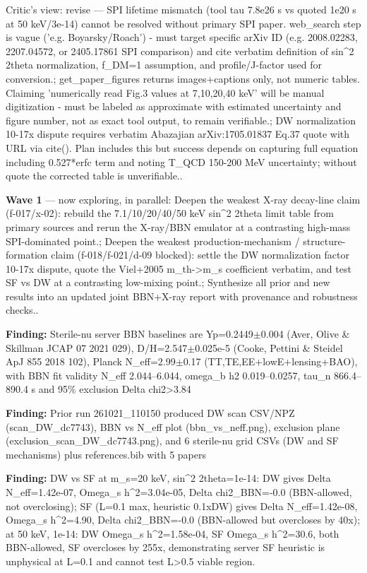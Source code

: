 \documentclass[11pt,a4paper]{article}
\begin{document}
\begin{enumerate}
Critic's view: revise --- SPI lifetime mismatch (tool tau 7.8e26 s vs quoted 1e20 s at 50 keV/3e-14) cannot be resolved without primary SPI paper. web\_search step is vague ('e.g. Boyarsky/Roach') - must target specific arXiv ID (e.g. 2008.02283, 2207.04572, or 2405.17861 SPI comparison) and cite verbatim definition of sin\textasciicircum{}2 2theta normalization, f\_DM=1 assumption, and profile/J-factor used for conversion.; get\_paper\_figures returns images+captions only, not numeric tables. Claiming 'numerically read Fig.3 values at 7,10,20,40 keV' will be manual digitization - must be labeled as approximate with estimated uncertainty and figure number, not as exact tool output, to remain verifiable.; DW normalization 10-17x dispute requires verbatim Abazajian arXiv:1705.01837 Eq.37 quote with URL via cite(). Plan includes this but success depends on capturing full equation including 0.527*erfc term and noting T\_QCD 150-200 MeV uncertainty; without quote the corrected table is unverifiable..

\end{enumerate}
\textbf{Wave 1} --- now exploring, in parallel: Deepen the weakest X-ray decay-line claim (f-017/x-02): rebuild the 7.1/10/20/40/50 keV sin\textasciicircum{}2 2theta limit table from primary sources and rerun the X-ray/BBN emulator at a contrasting high-mass SPI-dominated point.; Deepen the weakest production-mechanism / structure-formation claim (f-018/f-021/d-09 blocked): settle the DW normalization factor 10-17x dispute, quote the Viel+2005 m\_th-\textgreater{}m\_s coefficient verbatim, and test SF vs DW at a contrasting low-mixing point.; Synthesize all prior and new results into an updated joint BBN+X-ray report with provenance and robustness checks..

\textbf{Finding:} Sterile-nu server BBN baselines are Yp=0.2449$\pm$0.004 (Aver, Olive \& Skillman JCAP 07 2021 029), D/H=2.547$\pm$0.025e-5 (Cooke, Pettini \& Steidel ApJ 855 2018 102), Planck N\_eff=2.99$\pm$0.17 (TT,TE,EE+lowE+lensing+BAO), with BBN fit validity N\_eff 2.044--6.044, omega\_b h2 0.019--0.0257, tau\_n 866.4--890.4 s and 95\% exclusion Delta chi2\textgreater{}3.84

\textbf{Finding:} Prior run 261021\_110150 produced DW scan CSV/NPZ (scan\_DW\_dc7743), BBN vs N\_eff plot (bbn\_vs\_neff.png), exclusion plane (exclusion\_scan\_DW\_dc7743.png), and 6 sterile-nu grid CSVs (DW and SF mechanisms) plus references.bib with 5 papers

\textbf{Finding:} DW vs SF at m\_s=20 keV, sin\textasciicircum{}2 2theta=1e-14: DW gives Delta N\_eff=1.42e-07, Omega\_s h\textasciicircum{}2=3.04e-05, Delta chi2\_BBN=-0.0 (BBN-allowed, not overclosing); SF (L=0.1 max, heuristic 0.1xDW) gives Delta N\_eff=1.42e-08, Omega\_s h\textasciicircum{}2=4.90, Delta chi2\_BBN=-0.0 (BBN-allowed but overcloses by 40x); at 50 keV, 1e-14: DW Omega\_s h\textasciicircum{}2=1.58e-04, SF Omega\_s h\textasciicircum{}2=30.6, both BBN-allowed, SF overcloses by 255x, demonstrating server SF heuristic is unphysical at L=0.1 and cannot test L\textgreater{}0.5 viable region.
\end{document}
